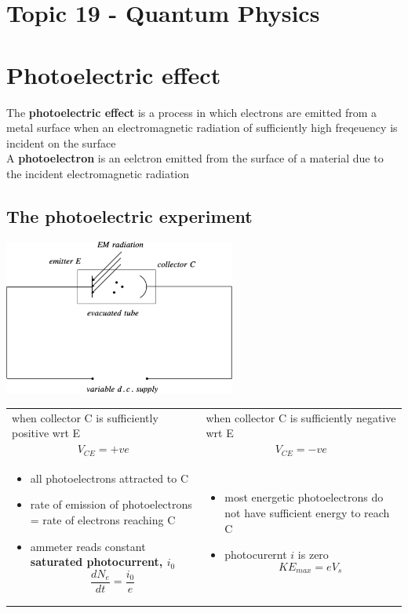 \documentclass[a4paper, 10pt]{article}
\begin{document}
\section*{Topic 19 - Quantum Physics}

\section{Photoelectric effect}

\begin{framed}
   The \textbf{photoelectric effect} is a process in which electrons are emitted from a metal surface when an electromagnetic radiation of sufficiently high freqeuency is incident on the surface \\
   A \textbf{photoelectron} is an eelctron emitted from the surface of a material due to the incident electromagnetic radiation
\end{framed}	

\subsection{The photoelectric experiment}
\begin{center}
   \includegraphics[width=3in]{figures/1.pdf} 
\end{center}

\begin{center}
   \begin{tabular}{T | T}
      when collector C is sufficiently positive wrt E & when collector C is sufficiently negative wrt E \\
      \[
         V_{CE} = +ve 
      \] &
      \[
         V_{CE} = -ve
      \] \\
      \begin{itemize}
         \item all photoelectrons attracted to C
         \item rate of emission of photoelectrons = rate of electrons reaching C
         \item ammeter reads constant \textbf{saturated photocurrent, $i_0$ }
            \[
                \frac{dN_e}{dt} = \frac{i_0}{e}
            \]
      \end{itemize}	  &
      \begin{itemize}
         \item most energetic photoelectrons do not have sufficient energy to reach C
         \item photocurernt $i$ is zero
            \[
               KE_{max} = eV_s
            \]
      \end{itemize}	
   \end{tabular}
\end{center}
\end{document}

